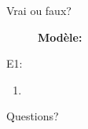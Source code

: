 \documentclass{beamer}
\begin{document}
  \begin{frame}{Vrai ou faux?}
     \\
    \tinygloss{}
    \begin{description}
      \item[] \textbf{Modèle:} \lexi{}
      \item[E1:]
    \end{description}
    \begin{enumerate}
      \item
    \end{enumerate}
  \end{frame}

  \begin{frame}{}
    \begin{center}
      \Large Questions?
    \end{center}
  \end{frame}
\end{document}
